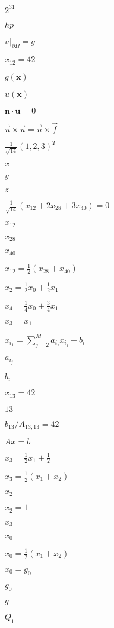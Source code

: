 \documentclass{article}
\begin{document}
$2^{31}$
\pagebreak

$hp$
\pagebreak

$u|_{\partial\Omega}=g$
\pagebreak

$x_{12}=42$
\pagebreak

$g(\mathbf x)$
\pagebreak

$u(\mathbf x)$
\pagebreak

$\mathbf n \cdot \mathbf u=0$
\pagebreak

$\vec{n}\times\vec{u}= \vec{n}\times\vec{f}$
\pagebreak

$\frac 1{\sqrt{14}} (1,2,3)^T$
\pagebreak

$x$
\pagebreak

$y$
\pagebreak

$z$
\pagebreak

$\frac 1{\sqrt{14}} (x_{12}+2x_{28}+3x_{40})=0$
\pagebreak

$x_{12}$
\pagebreak

$x_{28}$
\pagebreak

$x_{40}$
\pagebreak

$x_{12}= \frac 12 (x_{28}+x_{40})$
\pagebreak

$x_2=\frac 12 x_0 + \frac 12 x_1$
\pagebreak

$x_4=\frac 14 x_0 + \frac 34 x_1$
\pagebreak

$x_3=x_1$
\pagebreak

$x_{i_1} = \sum_{j=2}^M a_{i_j} x_{i_j} + b_i$
\pagebreak

$a_{i_j}$
\pagebreak

$b_i$
\pagebreak

$x_{13}=42$
\pagebreak

$13$
\pagebreak

$b_{13}/A_{13,13}=42$
\pagebreak

$Ax=b$
\pagebreak

$x_{3}=\tfrac 12 x_1 + \tfrac 12$
\pagebreak

$x_{3}=\tfrac 12 (x_1 + x_2)$
\pagebreak

$x_2$
\pagebreak

$x_2=1$
\pagebreak

$x_3$
\pagebreak

$x_0$
\pagebreak

$x_0=\frac 12 (x_{1}+x_{2})$
\pagebreak

$x_0=g_0$
\pagebreak

$g_0$
\pagebreak

$g$
\pagebreak

$Q_1$
\pagebreak
\end{document}
